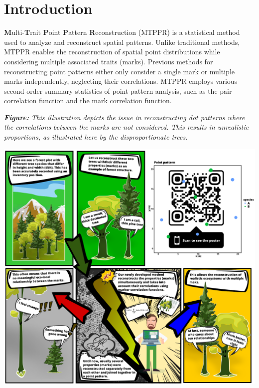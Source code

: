 \documentclass[
  letterpaper,
  DIV=11,
  numbers=noendperiod]{scrreprt}
\begin{document}

\chapter{Introduction}\label{introduction}

\textbf{M}ulti-\textbf{T}rait \textbf{P}oint \textbf{P}attern
\textbf{R}econstruction (MTPPR) is a statistical method used to analyze
and reconstruct spatial patterns. Unlike traditional methods, MTPPR
enables the reconstruction of spatial point distributions while
considering multiple associated traits (marks). Previous methods for
reconstructing point patterns either only consider a single mark or
multiple marks independently, neglecting their correlations. MTPPR
employs various second-order summary statistics of point pattern
analysis, such as the pair correlation function and the mark correlation
function.

\textbf{\emph{Figure:}} \emph{This illustration depicts the issue in
reconstructing dot patterns where the correlations between the marks are
not considered. This results in unrealistic proportions, as illustrated
here by the disproportionate trees.}

\begin{center}
\includegraphics[width=10.41667in,height=\textheight]{images/comic.png}
\end{center}
\end{document}
